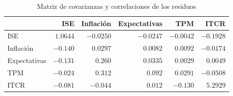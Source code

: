 \begin{table}[H]
\centering
\caption{Matriz de covarianzas y correlaciones de los residuos}
\label{tab:sigma}
\small
\begin{tabular}{@{}lrrrrr@{}}
\toprule
 & ISE & Inflación & Expectativas & TPM & ITCR \\
\midrule
ISE & $\mathbf{1.0644}$ & $-0.0250$ & $-0.0247$ & $-0.0042$ & $-0.1928$ \\
Inflación & $-0.140$ & $\mathbf{0.0297}$ & $0.0082$ & $0.0092$ & $-0.0174$ \\
Expectativas & $-0.131$ & $0.260$ & $\mathbf{0.0335}$ & $0.0029$ & $0.0049$ \\
TPM & $-0.024$ & $0.312$ & $0.092$ & $\mathbf{0.0291}$ & $-0.0508$ \\
ITCR & $-0.081$ & $-0.044$ & $0.012$ & $-0.130$ & $\mathbf{5.2929}$ \\
\bottomrule
\end{tabular}
\end{table}
